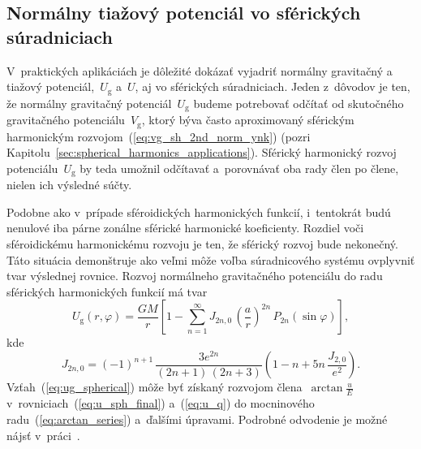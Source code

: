 \documentclass[a4paper, 12pt]{book}
\newcommand{\gidx}{\mathrm g}
\begin{document}
\subsection{Normálny tiažový potenciál vo sférických súradniciach}
\label{sec:normal_gravity_potential_in_spherical_coords}

V~praktických aplikáciách je dôležité dokázať vyjadriť normálny gravitačný 
a tiažový potenciál,~$U_\gidx$ a~$U$, aj vo sférických súradniciach.  Jeden 
z~dôvodov je ten, že normálny gravitačný potenciál~$U_\gidx$ budeme potrebovať 
odčítať od skutočného gravitačného potenciálu~$V_\gidx$, ktorý býva často 
aproximovaný sférickým harmonickým rozvojom~(\ref{eq:vg_sh_2nd_norm_ynk}) 
(pozri Kapitolu~\ref{sec:spherical_harmonics_applications}).  Sférický 
harmonický rozvoj potenciálu~$U_\gidx$ by teda umožnil odčítavať a~porovnávať 
oba rady člen po člene, nielen ich výsledné súčty.

Podobne ako v~prípade sféroidických harmonických funkcií, i~tentokrát budú 
nenulové iba párne zonálne sférické harmonické koeficienty.  Rozdiel voči 
sféroidickému harmonickému rozvoju je ten, že sférický rozvoj bude nekonečný.  
Táto situácia demonštruje ako veľmi môže voľba súradnicového systému ovplyvniť 
tvar výslednej rovnice.  Rozvoj normálneho gravitačného potenciálu do radu 
sférických harmonických funkcií má tvar \parencite{Moritz1967}
%
\begin{equation}
\label{eq:ug_spherical}
U_\gidx(r, \varphi) = \frac{GM}{r} \left[ 1 - \sum_{n = 1}^{\infty} J_{2n,0} \, 
\left( \frac{a}{r} \right)^{2n} \, P_{2n}(\sin\varphi) \right]{,}
\end{equation}
%
kde
%
\begin{equation}
\label{eq:j2n0}
J_{2n,0} = (-1)^{n + 1} \, \frac{3e^{2n}}{(2n + 1) \, (2n + 3)} \left( 
1 - n + 5n \, \frac{J_{2,0}}{e^2} \right){.}
\end{equation}
%
Vzťah~(\ref{eq:ug_spherical}) môže byť získaný rozvojom 
člena~$\arctan\frac{u}{E}$ v~rovniciach~(\ref{eq:u_sph_final}) a~(\ref{eq:u_q}) 
do mocninového radu~(\ref{eq:arctan_series}) a~ďalšími úpravami.  Podrobné 
odvodenie je možné nájsť v~práci~\textcite{Moritz1967}.
\end{document}

